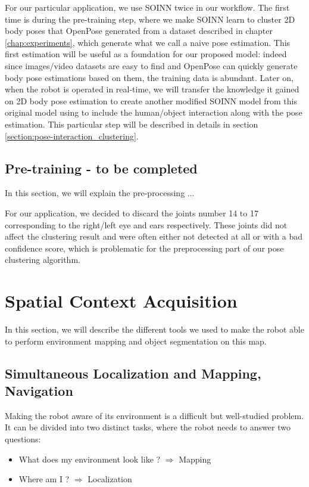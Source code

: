 For our particular application, we use SOINN twice in our workflow. The first time is during the pre-training step, where we make SOINN learn to cluster 2D body poses that OpenPose generated from a dataset described in chapter \ref{chap:experiments}, which generate what we call a naive pose estimation. This first estimation will be useful as a foundation for our proposed model: indeed since images/video datasets are easy to find and OpenPose can quickly generate body pose estimations based on them, the training data is abundant. Later on, when the robot is operated in real-time, we will transfer the knowledge it gained on 2D body pose estimation to create another modified SOINN model from this original model using to include the human/object interaction along with the pose estimation. This particular step will be described in details in section \ref{section:pose-interaction_clustering}.

\subsection{Pre-training - to be completed}
In this section, we will explain the pre-processing ...

For our application, we decided to discard the joints number 14 to 17 corresponding to the right/left eye and ears respectively. These joints did not affect the clustering result and were often either not detected at all or with a bad confidence score, which is problematic for the preprocessing part of our pose clustering algorithm.

\section{Spatial Context Acquisition}
In this section, we will describe the different tools we used to make the robot able to perform environment mapping and object segmentation on this map.

\subsection{Simultaneous Localization and Mapping, Navigation}
Making the robot aware of its environment is a difficult but well-studied problem. It can be divided into two distinct tasks, where the robot needs to answer two questions:
\begin{itemize}
    \item{What does my environment look like ? $\Rightarrow$ Mapping}
    \item{Where am I ? $\Rightarrow$ Localization}
\end{itemize}

